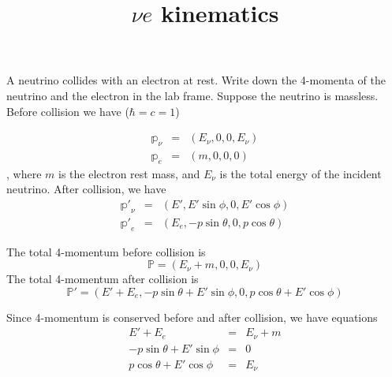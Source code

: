 \documentclass{beamer}
\date{}
\title{\texorpdfstring{$\nu e$}{nu-e} kinematics}
\begin{document}
\begin{frame}
\titlepage
\end{frame}
\begin{frame}[allowframebreaks]{}

\begin{figure}
\centering
\end{figure}


A neutrino collides with an electron at rest. Write down the 4-momenta of the neutrino and the electron in the lab frame. Suppose the neutrino is massless. Before collision we have ($\hbar=c=1$)

\framebreak

\begin{eqnarray}
\mathbb{p}_\nu &=&(E_\nu,0,0,E_\nu) \label{eq:pnu}\\
\mathbb{p}_e&=&(m,0,0,0) \label{eq:pe}
\end{eqnarray}
, where $m$ is the electron rest mass, and $E_\nu$ is the total energy of the incident neutrino.
After collision, we have
\begin{eqnarray}
\mathbb{p'}_\nu &=&(E',E'\sin\phi,0,E'\cos\phi) \label{eq:ppnu} \\
\mathbb{p'}_e &=& (E_e,-p\sin\theta,0,p\cos\theta) \label{eq:ppe}
\end{eqnarray}


The total 4-momentum before collision is
\begin{equation} \label{eq:ptot}
  \mathbb{P} = (E_\nu+m,0,0,E_\nu)
\end{equation}
The total 4-momentum after collision is
\begin{equation} \label{eq:pptot}
  \mathbb{P}' = (E'+E_e,-p\sin\theta+E'\sin\phi,0,p\cos\theta+E'\cos\phi)
\end{equation}

\framebreak

Since 4-momentum is conserved before and after collision, we have equations
\begin{eqnarray}
  E'+E_e &=& E_\nu+m \label{eq:E} \\
  -p\sin\theta+E'\sin\phi &=& 0 \label{eq:ptotx} \\
  p\cos\theta+E'\cos\phi &=& E_\nu \label{eq:ptotz}
\end{eqnarray}


\end{frame}
\end{document}
